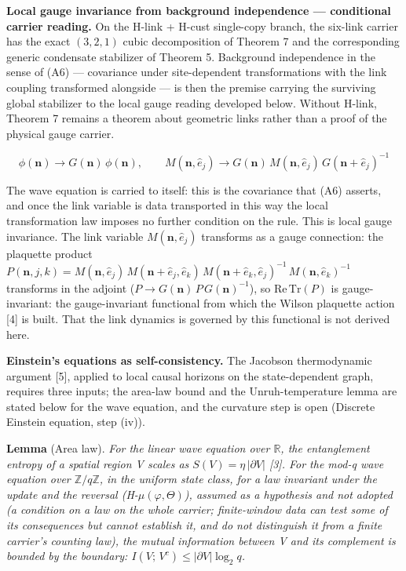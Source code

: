 \documentclass[
]{article}
\begin{document}
\textbf{Local gauge invariance from background independence ---
conditional carrier reading.} On the H-link + H-cust single-copy branch,
the six-link carrier has the exact \((3,2,1)\) cubic decomposition of
Theorem 7 and the corresponding generic condensate stabilizer of Theorem
5. Background independence in the sense of (A6) --- covariance under
site-dependent transformations with the link coupling transformed
alongside --- is then the premise carrying the surviving global
stabilizer to the local gauge reading developed below. Without H-link,
Theorem 7 remains a theorem about geometric links rather than a proof of
the physical gauge carrier.

\[\phi(\mathbf{n}) \to G(\mathbf{n})\,\phi(\mathbf{n}), \qquad M(\mathbf{n}, \hat{e}_j) \to G(\mathbf{n})\,M(\mathbf{n}, \hat{e}_j)\,G(\mathbf{n}+\hat{e}_j)^{-1}\]

The wave equation is carried to itself: this is the covariance that (A6)
asserts, and once the link variable is data transported in this way the
local transformation law imposes no further condition on the rule. This
is local gauge invariance. The link variable
\(M(\mathbf{n}, \hat{e}_j)\) transforms as a gauge connection: the
plaquette product
\(P(\mathbf{n}, j, k) = M(\mathbf{n}, \hat{e}_j)\,M(\mathbf{n}+\hat{e}_j, \hat{e}_k)\,M(\mathbf{n}+\hat{e}_k, \hat{e}_j)^{-1}\,M(\mathbf{n}, \hat{e}_k)^{-1}\)
transforms in the adjoint
(\(P \to G(\mathbf{n})\,P\,G(\mathbf{n})^{-1}\)), so
\(\mathrm{Re\,Tr}(P)\) is gauge-invariant: the gauge-invariant
functional from which the Wilson plaquette action {[}4{]} is built. That
the link dynamics is governed by this functional is not derived here.

\textbf{Einstein's equations as self-consistency.} The Jacobson
thermodynamic argument {[}5{]}, applied to local causal horizons on the
state-dependent graph, requires three inputs; the area-law bound and the
Unruh-temperature lemma are stated below for the wave equation, and the
curvature step is open (Discrete Einstein equation, step (iv)).

\textbf{Lemma} (Area law). \emph{For the linear wave equation over
\(\mathbb{R}\), the entanglement entropy of a spatial region V scales as
\(S(V) = \eta\,|\partial V|\) {[}3{]}. For the mod-q wave equation over
\(\mathbb{Z}/q\mathbb{Z}\), in the uniform state class, for a law
invariant under the update and the reversal (H-\(\mu(\varphi,\Theta)\)),
assumed as a hypothesis and not adopted (a condition on a law on the
whole carrier; finite-window data can test some of its consequences but
cannot establish it, and do not distinguish it from a finite carrier's
counting law), the mutual information between V and its complement is
bounded by the boundary: \(I(V;\,V^c) \le |\partial V| \log_2 q\).}
\end{document}
